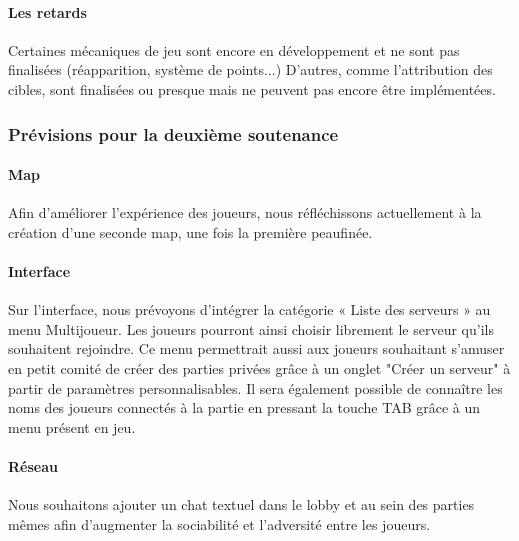         \paragraph{Les retards}

            Certaines mécaniques de jeu sont encore en développement et ne sont pas finalisées (réapparition, système de points...)
            D'autres, comme l'attribution des cibles, sont finalisées ou presque mais ne peuvent pas encore être implémentées.

                
    \vspace{0.5cm}
    \subsubsection{Prévisions pour la deuxième soutenance}
    \vspace{0.5cm}

        \paragraph{Map}

            Afin d'améliorer l'expérience des joueurs, nous réfléchissons actuellement à la création d'une 
            seconde map, une fois la première peaufinée.

        \paragraph{Interface}

            Sur l’interface, nous prévoyons d’intégrer la catégorie « Liste des serveurs » au menu Multijoueur. 
            Les joueurs pourront ainsi choisir librement le serveur qu’ils souhaitent rejoindre. 
            Ce menu permettrait aussi aux joueurs souhaitant s'amuser en petit comité de créer des 
            parties privées grâce à un onglet "Créer un serveur" à partir de paramètres personnalisables. 
            Il sera également possible de connaître les noms des joueurs connectés à la partie en pressant 
            la touche TAB grâce à un menu présent en jeu.

        \paragraph{Réseau}

            Nous souhaitons ajouter un chat textuel dans le lobby et au sein des parties mêmes afin d’augmenter la sociabilité 
            et l’adversité entre les joueurs.

